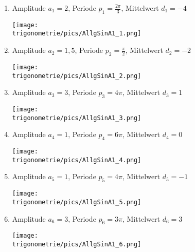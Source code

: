 \begin{Answer}[ref=allgSinCosA1]
	\begin{enumerate}[label=\alph*)]
		\item Amplitude \(a_{1}=2\), Periode \(p_{1}=\frac{2\pi}{3}\), Mittelwert \(d_{1}=-4\)\\
		\begin{minipage}{\textwidth}
			\texttt{[image: \\trigonometrie/pics/AllgSinA1\_1.png]}\\
		\end{minipage}	 
		\item Amplitude \(a_{2}=1,5\), Periode \(p_{2}=\frac{\pi}{2}\), Mittelwert \(d_{2}=-2\)\\
		\begin{minipage}{\textwidth}
			\texttt{[image: \\trigonometrie/pics/AllgSinA1\_2.png]}\\
		\end{minipage}	 
		\item Amplitude \(a_{3}=3\), Periode \(p_{3}=4\pi\), Mittelwert \(d_{3}=1\)\\
		\begin{minipage}{\textwidth}
			\texttt{[image: \\trigonometrie/pics/AllgSinA1\_3.png]}\\
		\end{minipage}	 
		\item Amplitude \(a_{4}=1\), Periode \(p_{4}=6\pi\), Mittelwert \(d_{4}=0\)\\
		\begin{minipage}{\textwidth}
			\texttt{[image: \\trigonometrie/pics/AllgSinA1\_4.png]}\\
		\end{minipage}	 
		\item Amplitude \(a_{5}=1\), Periode \(p_{5}=4\pi\), Mittelwert \(d_{5}=-1\)\\
		\begin{minipage}{\textwidth}
			\texttt{[image: \\trigonometrie/pics/AllgSinA1\_5.png]}\\
		\end{minipage}	 
		\item Amplitude \(a_{6}=3\), Periode \(p_{6}=3\pi\), Mittelwert \(d_{6}=3\)\\
		\begin{minipage}{\textwidth}
			\texttt{[image: \\trigonometrie/pics/AllgSinA1\_6.png]}\\
		\end{minipage}	 

\end{enumerate}
\end{Answer}
